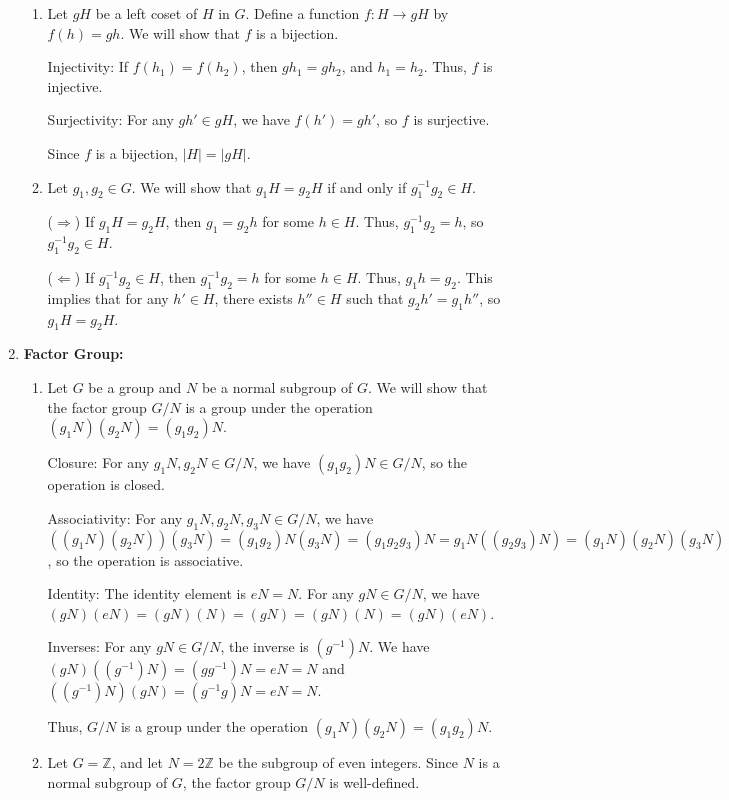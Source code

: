 \begin{enumerate}
\begin{enumerate}
    \item Let $gH$ be a left coset of $H$ in $G$. Define a function $f : H \to gH$ by $f(h) = gh$. We will show that $f$ is a bijection.

    Injectivity: If $f(h_1) = f(h_2)$, then $gh_1 = gh_2$, and $h_1 = h_2$. Thus, $f$ is injective.

    Surjectivity: For any $gh' \in gH$, we have $f(h') = gh'$, so $f$ is surjective.

    Since $f$ is a bijection, $|H| = |gH|$.

    \item Let $g_1, g_2 \in G$. We will show that $g_1H = g_2H$ if and only if $g_1^{-1}g_2 \in H$.

    ($\Rightarrow$) If $g_1H = g_2H$, then $g_1 = g_2h$ for some $h \in H$. Thus, $g_1^{-1}g_2 = h$, so $g_1^{-1}g_2 \in H$.

    ($\Leftarrow$) If $g_1^{-1}g_2 \in H$, then $g_1^{-1}g_2 = h$ for some $h \in H$. Thus, $g_1h = g_2$. This implies that for any $h' \in H$, there exists $h'' \in H$ such that $g_2h' = g_1h''$, so $g_1H = g_2H$.
  \end{enumerate}

  \item \textbf{Factor Group:}
  \begin{enumerate}
    \item Let $G$ be a group and $N$ be a normal subgroup of $G$. We will show that the factor group $G/N$ is a group under the operation $(g_1N)(g_2N) = (g_1g_2)N$.

    Closure: For any $g_1N, g_2N \in G/N$, we have $(g_1g_2)N \in G/N$, so the operation is closed.

    Associativity: For any $g_1N, g_2N, g_3N \in G/N$, we have $((g_1N)(g_2N))(g_3N) = (g_1g_2)N(g_3N) = (g_1g_2g_3)N = g_1N((g_2g_3)N) = (g_1N)(g_2N)(g_3N)$, so the operation is associative.

    Identity: The identity element is $eN = N$. For any $gN \in G/N$, we have $(gN)(eN) = (gN)(N) = (gN) = (gN)(N) = (gN)(eN)$.

    Inverses: For any $gN \in G/N$, the inverse is $(g^{-1})N$. We have $(gN)((g^{-1})N) = (gg^{-1})N = eN = N$ and $((g^{-1})N)(gN) = (g^{-1}g)N = eN = N$.

    Thus, $G/N$ is a group under the operation $(g_1N)(g_2N) = (g_1g_2)N$.

    \item Let $G = \mathbb{Z}$, and let $N = 2\mathbb{Z}$ be the subgroup of even integers. Since $N$ is a normal subgroup of $G$, the factor group $G/N$ is well-defined.


\end{enumerate}
\end{enumerate}

